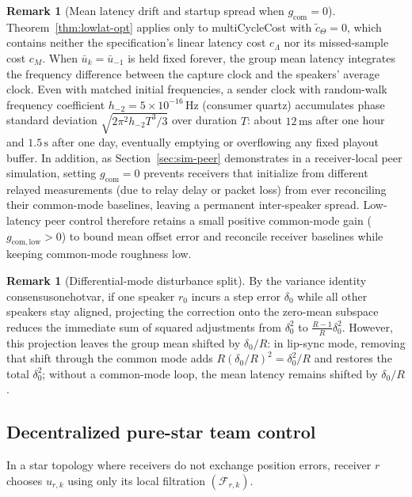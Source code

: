 \documentclass[11pt,a4paper]{article}
\DeclareRobustCommand{\lean}[1]{{\ttfamily\def\_{\textunderscore\allowbreak}#1}}
\theoremstyle{definition}
\newtheorem{remark}[definition]{Remark}
\begin{document}
\begin{remark}[Mean latency drift and startup spread when $g_{\mathrm{com}} = 0$]
\label{rem:drift}
Theorem~\ref{thm:lowlat-opt} applies only to \lean{multiCycleCost} with
$\tilde c_\Theta = 0$, which contains neither the specification's linear latency
cost $c_\Lambda$ nor its missed-sample cost $c_M$. When $\bar u_k = \bar u_{-1}$
is held fixed forever, the group mean latency integrates the frequency
difference between the capture clock and the speakers' average clock. Even with
matched initial frequencies, a sender clock with random-walk frequency
coefficient $h_{-2} = 5\times 10^{-16}\,\text{Hz}$ (consumer quartz) accumulates
phase standard deviation $\sqrt{2\pi^2 h_{-2} T^3 / 3}$ over duration $T$:
about $12\,\text{ms}$ after one hour and $1.5\,\text{s}$ after one day,
eventually emptying or overflowing any fixed playout buffer. In addition, as
Section~\ref{sec:sim-peer} demonstrates in a receiver-local peer simulation,
setting $g_{\mathrm{com}} = 0$ prevents receivers that initialize from
different relayed measurements (due to relay delay or packet loss) from ever
reconciling their common-mode baselines, leaving a permanent inter-speaker
spread. Low-latency peer control therefore retains a small positive common-mode
gain ($g_{\mathrm{com,low}} > 0$) to bound mean offset error and reconcile
receiver baselines while keeping common-mode roughness low.
\end{remark}

\begin{remark}[Differential-mode disturbance split]
By the variance identity \lean{consensus\_one\_hot\_var}, if one speaker
$r_0$ incurs a step error $\delta_0$ while all other speakers stay aligned,
projecting the correction onto the zero-mean subspace reduces the immediate sum
of squared adjustments from $\delta_0^2$ to $\frac{R-1}{R}\delta_0^2$. However,
this projection leaves the group mean shifted by $\delta_0 / R$: in lip-sync
mode, removing that shift through the common mode adds
$R(\delta_0 / R)^2 = \delta_0^2 / R$ and restores the total $\delta_0^2$;
without a common-mode loop, the mean latency remains shifted by $\delta_0 / R$.
\end{remark}

\subsection{Decentralized pure-star team control}

In a star topology where receivers do not exchange position errors, receiver
$r$ chooses $u_{r,k}$ using only its local filtration $(\mathcal{F}_{r,k})$.
\end{document}
